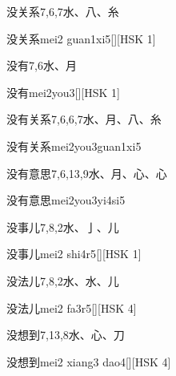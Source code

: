 \begin{entry}{没关系}{7,6,7}{⽔、⼋、⽷}
  \begin{phonetics}{没关系}{mei2 guan1xi5}[][HSK 1]
  \end{phonetics}
\end{entry}

\begin{entry}{没有}{7,6}{⽔、⽉}
  \begin{phonetics}{没有}{mei2you3}[][HSK 1]
  \end{phonetics}
\end{entry}

\begin{entry}{没有关系}{7,6,6,7}{⽔、⽉、⼋、⽷}
  \begin{phonetics}{没有关系}{mei2you3guan1xi5}
  \end{phonetics}
\end{entry}

\begin{entry}{没有意思}{7,6,13,9}{⽔、⽉、⼼、⼼}
  \begin{phonetics}{没有意思}{mei2you3yi4si5}
  \end{phonetics}
\end{entry}

\begin{entry}{没事儿}{7,8,2}{⽔、⼅、⼉}
  \begin{phonetics}{没事儿}{mei2 shi4r5}[][HSK 1]
  \end{phonetics}
\end{entry}

\begin{entry}{没法儿}{7,8,2}{⽔、⽔、⼉}
  \begin{phonetics}{没法儿}{mei2 fa3r5}[][HSK 4]
  \end{phonetics}
\end{entry}

\begin{entry}{没想到}{7,13,8}{⽔、⼼、⼑}
  \begin{phonetics}{没想到}{mei2 xiang3 dao4}[][HSK 4]
  \end{phonetics}
\end{entry}

